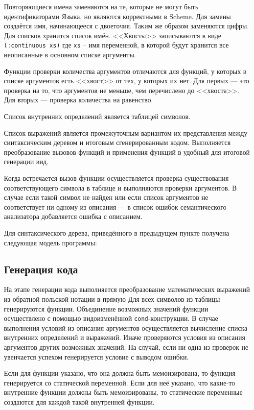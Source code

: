     Повторяющиеся имена заменяются на те, которые не могут быть идентификаторами Языка, но являются корректными в Scheme.
    Для замены создаётся имя, начинающееся с двоеточия.
    Таким же образом заменяются цифры.
    Для списков хранится список имён.
    <<Хвосты>> записываются в виде \verb,(:continuous xs), где \verb/xs/ -- имя переменной, в которой будут хранится все неописанные в основном списке аргументы.

    Функции проверки количества аргументов отличаются для функций, у которых в списке аргументов есть <<хвост>> от тех, у которых их нет.
    Для первых --- это проверка на то, что аргументов не меньше, чем перечислено до <<хвоста>>.
    Для вторых --- проверка количества на равенство.

    Список внутренних определений является таблицей символов.

    Список выражений является промежуточным вариантом их представления между синтаксическим деревом и итоговым сгенерированным кодом.
    Выполняется преобразование вызовов функций и применения функций в удобный для итоговой генерации вид.

    Когда встречается вызов функции осуществляется проверка существования соответствующего символа в таблице и выполняются проверки аргументов.
    В случае если такой символ не найден или если список аргументов не соответствует ни одному из описания --- в список ошибок семантического анализатора добавляется ошибка с описанием.

    Для синтаксического дерева, приведённого в предыдущем пункте получена следующая модель программы:
    
    
    
    \subsection{Генерация кода}
    На этапе генерации кода выполняется преобразование математических выражений из обратной польской нотации в прямую
    Для всех символов из таблицы генерируются функции.
    Объединение возможных значений функции осуществлено с помощью видоизменённой \verb$cond$-конструкции.
    В случае выполнения условий из описания аргументов осуществляется вычисление списка внутренних определений и выражений.
    Иначе проверяются условия из описания аргументов других возможных значений.
    На случай, если ни одна из проверок не увенчается успехом генерируется условие с выводом ошибки.

    Если для функции указано, что она должна быть мемоизирована, то функция генерируется со статической переменной.
    Если для неё указано, что какие-то внутренние функции должны быть мемоизированы, то статические переменные создаются для каждой такой внутренней функции.


